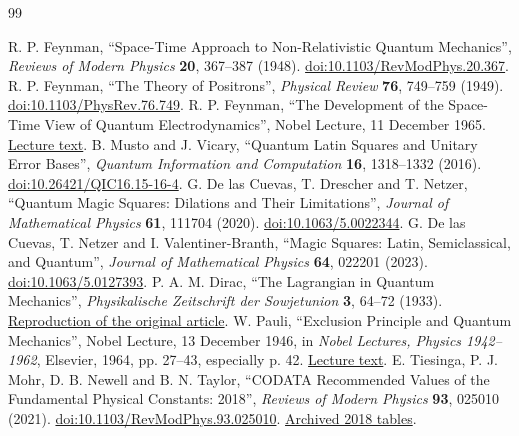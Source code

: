 \begingroup
\fontsize{8.3}{9.7}\selectfont
\setlength{\parskip}{0pt}
\begin{thebibliography}{99}
\setlength{\itemsep}{1.5pt}
 R. P. Feynman, ``Space-Time Approach to Non-Relativistic Quantum Mechanics'', \emph{Reviews of Modern Physics} \textbf{20}, 367--387 (1948). \href{https://doi.org/10.1103/RevModPhys.20.367}{doi:10.1103/RevModPhys.20.367}.
 R. P. Feynman, ``The Theory of Positrons'', \emph{Physical Review} \textbf{76}, 749--759 (1949). \href{https://doi.org/10.1103/PhysRev.76.749}{doi:10.1103/PhysRev.76.749}.
 R. P. Feynman, ``The Development of the Space-Time View of Quantum Electrodynamics'', Nobel Lecture, 11 December 1965. \href{https://www.nobelprize.org/prizes/physics/1965/feynman/lecture/}{Lecture text}.
 B. Musto and J. Vicary, ``Quantum Latin Squares and Unitary Error Bases'', \emph{Quantum Information and Computation} \textbf{16}, 1318--1332 (2016). \href{https://doi.org/10.26421/QIC16.15-16-4}{doi:10.26421/QIC16.15-16-4}.
 G. De las Cuevas, T. Drescher and T. Netzer, ``Quantum Magic Squares: Dilations and Their Limitations'', \emph{Journal of Mathematical Physics} \textbf{61}, 111704 (2020). \href{https://doi.org/10.1063/5.0022344}{doi:10.1063/5.0022344}.
 G. De las Cuevas, T. Netzer and I. Valentiner-Branth, ``Magic Squares: Latin, Semiclassical, and Quantum'', \emph{Journal of Mathematical Physics} \textbf{64}, 022201 (2023). \href{https://doi.org/10.1063/5.0127393}{doi:10.1063/5.0127393}.
 P. A. M. Dirac, ``The Lagrangian in Quantum Mechanics'', \emph{Physikalische Zeitschrift der Sowjetunion} \textbf{3}, 64--72 (1933). \href{https://www.informationphilosopher.com/solutions/scientists/dirac/Lagrangian_1933.pdf}{Reproduction of the original article}.
 W. Pauli, ``Exclusion Principle and Quantum Mechanics'', Nobel Lecture, 13 December 1946, in \emph{Nobel Lectures, Physics 1942--1962}, Elsevier, 1964, pp. 27--43, especially p. 42. \href{https://www.nobelprize.org/uploads/2018/06/pauli-lecture.pdf}{Lecture text}.
 E. Tiesinga, P. J. Mohr, D. B. Newell and B. N. Taylor, ``CODATA Recommended Values of the Fundamental Physical Constants: 2018'', \emph{Reviews of Modern Physics} \textbf{93}, 025010 (2021). \href{https://doi.org/10.1103/RevModPhys.93.025010}{doi:10.1103/RevModPhys.93.025010}. \href{https://physics.nist.gov/cuu/Constants/ArchiveASCII/allascii_2018.txt}{Archived 2018 tables}.

\end{thebibliography}
